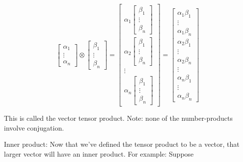 \documentclass[main.tex]{subfiles}
\begin{document}
    $$
    \left[\begin{array}{c}
    \alpha_{1} \\
    \vdots \\
    \alpha_{n}
    \end{array}\right] \otimes\left[\begin{array}{c}
    \beta_{1} \\
    \vdots \\
    \beta_{n}
    \end{array}\right]
    =\left[\begin{array}{c}
    \alpha_{1}\left[\begin{array}{c}
    \beta_{1} \\
    \vdots \\
    \beta_{n}
    \end{array}\right] \\
    \alpha_{2}\left[\begin{array}{c}
    \beta_{1} \\
    \vdots \\
    \beta_{n}
    \end{array}\right] \\
    \vdots \\
    \alpha_{n}\left[\begin{array}{c}
    \beta_{1} \\
    \vdots \\
    \beta_{n}
    \end{array}\right]
    \end{array}\right]=\left[\begin{array}{c}
    \alpha_{1} \beta_{1} \\
    \vdots \\
    \alpha_{1} \beta_{n} \\
    \alpha_{2} \beta_{1} \\
    \vdots \\
    \alpha_{2} \beta_{n} \\
    \vdots \\
    \alpha_{n} \beta_{1} \\
    \vdots \\
    \alpha_{n} \beta_{n}
    \end{array}\right]
    $$
    
    This is called the vector tensor product. Note: none of the number-products involve conjugation.
    
    Inner product: Now that we've defined the tensor product to be a vector, that larger vector will have an inner product. For example: Suppose
    
\end{document}
